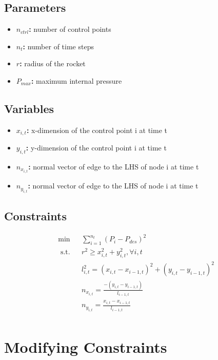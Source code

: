 \documentclass[12pt]{article}
\begin{document}
	\subsection{Parameters}
	\begin{itemize}
	\item \textbf{$n_{ctrl}$:} number of control points
	\item \textbf{$n_t$:} number of time steps
	\item \textbf{$r$:} radius of the rocket
	\item \textbf{$P_{max}$:} maximum internal pressure
	\end{itemize}
	
	\subsection{Variables}
	\begin{itemize}
		\item \textbf{$x_{i,t}$:} x-dimension of the control point i at time t
		\item \textbf{$y_{i,t}$:} y-dimension of the control point i at time t
		\item \textbf{$n_{x_{i,t}}$:} normal vector of edge to the LHS of node i at time t
		\item \textbf{$n_{y_{i,t}}$:} normal vector of edge to the LHS of node i at time t
	\end{itemize}
	
	\subsection{Constraints}
	
	\begin{equation}
	\begin{aligned}
	& \min &&\sum_{i=1}^{n_t} (P_{i} - P_{des})^2\\
	& \text{ s.t.} && r^2 \geq x_{i,t}^2 + y_{i,t}^2, \forall i, t \\
	& && l_{i,t}^2 = (x_{i,t} - x_{i-1,t})^2 + (y_{i,t} - y_{i-1,t})^2 \\
	& && n_{x_{i,t}} = \frac{-(y_{i,t}-y_{i-1,t})}{l_{i-1,t}} \\
	& && n_{y_{i,t}} = \frac{x_{i,t}-x_{i-1,t}}{l_{i-1,t}} \\
	\end{aligned}
	\end{equation}
	
	\section{Modifying Constraints}
\end{document}
